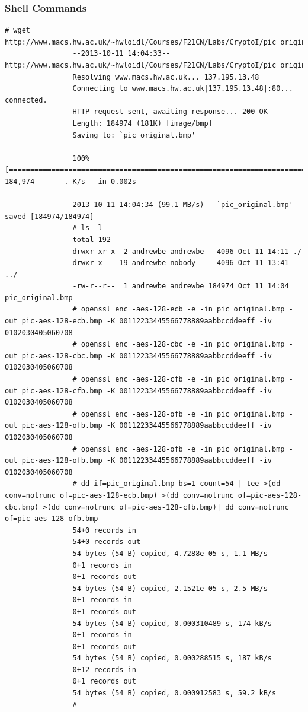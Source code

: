 		\subsubsection{Shell Commands}
			\begin{lstlisting}[label={Shell Commands},caption={Task 1}]
				# wget http://www.macs.hw.ac.uk/~hwloidl/Courses/F21CN/Labs/CryptoI/pic_original.bmp
				--2013-10-11 14:04:33--  http://www.macs.hw.ac.uk/~hwloidl/Courses/F21CN/Labs/CryptoI/pic_original.bmp
				Resolving www.macs.hw.ac.uk... 137.195.13.48
				Connecting to www.macs.hw.ac.uk|137.195.13.48|:80... connected.
				HTTP request sent, awaiting response... 200 OK
				Length: 184974 (181K) [image/bmp]
				Saving to: `pic_original.bmp'

				100%[=========================================================================>] 184,974     --.-K/s   in 0.002s

				2013-10-11 14:04:34 (99.1 MB/s) - `pic_original.bmp' saved [184974/184974]
				# ls -l
				total 192
				drwxr-xr-x  2 andrewbe andrewbe   4096 Oct 11 14:11 ./
				drwxr-x--- 19 andrewbe nobody     4096 Oct 11 13:41 ../
				-rw-r--r--  1 andrewbe andrewbe 184974 Oct 11 14:04 pic_original.bmp
				# openssl enc -aes-128-ecb -e -in pic_original.bmp -out pic-aes-128-ecb.bmp -K 00112233445566778889aabbccddeeff -iv 0102030405060708
				# openssl enc -aes-128-cbc -e -in pic_original.bmp -out pic-aes-128-cbc.bmp -K 00112233445566778889aabbccddeeff -iv 0102030405060708
				# openssl enc -aes-128-cfb -e -in pic_original.bmp -out pic-aes-128-cfb.bmp -K 00112233445566778889aabbccddeeff -iv 0102030405060708
				# openssl enc -aes-128-ofb -e -in pic_original.bmp -out pic-aes-128-ofb.bmp -K 00112233445566778889aabbccddeeff -iv 0102030405060708
				# openssl enc -aes-128-ofb -e -in pic_original.bmp -out pic-aes-128-ofb.bmp -K 00112233445566778889aabbccddeeff -iv 0102030405060708
				# dd if=pic_original.bmp bs=1 count=54 | tee >(dd conv=notrunc of=pic-aes-128-ecb.bmp) >(dd conv=notrunc of=pic-aes-128-cbc.bmp) >(dd conv=notrunc of=pic-aes-128-cfb.bmp)| dd conv=notrunc of=pic-aes-128-ofb.bmp
				54+0 records in
				54+0 records out
				54 bytes (54 B) copied, 4.7288e-05 s, 1.1 MB/s
				0+1 records in
				0+1 records out
				54 bytes (54 B) copied, 2.1521e-05 s, 2.5 MB/s
				0+1 records in
				0+1 records out
				54 bytes (54 B) copied, 0.000310489 s, 174 kB/s
				0+1 records in
				0+1 records out
				54 bytes (54 B) copied, 0.000288515 s, 187 kB/s
				0+12 records in
				0+1 records out
				54 bytes (54 B) copied, 0.000912583 s, 59.2 kB/s
				#
			\end{lstlisting}
			
